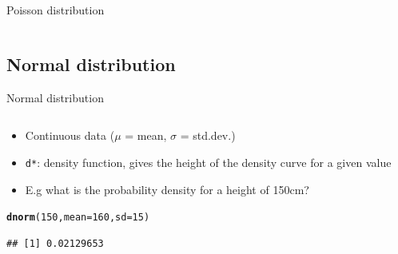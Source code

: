 \documentclass[aspectratio=169]{beamer}\usepackage[]{graphicx}\usepackage[]{color}
\makeatletter
\newcommand{\hlnum}[1]{\textcolor[rgb]{0.686,0.059,0.569}{#1}}%
\newcommand{\hlstd}[1]{\textcolor[rgb]{0.345,0.345,0.345}{#1}}%
\newcommand{\hlkwc}[1]{\textcolor[rgb]{0.333,0.667,0.333}{#1}}%
\newcommand{\hlkwd}[1]{\textcolor[rgb]{0.737,0.353,0.396}{\textbf{#1}}}%
\newenvironment{kframe}{%
 \def\at@end@of@kframe{}%
 \ifinner\ifhmode%
  \def\at@end@of@kframe{\end{minipage}}%
  \begin{minipage}{\columnwidth}%
 \fi\fi%
 \def\FrameCommand##1{\hskip\@totalleftmargin \hskip-\fboxsep
 \colorbox{shadecolor}{##1}\hskip-\fboxsep
     \hskip-\linewidth \hskip-\@totalleftmargin \hskip\columnwidth}%
 \MakeFramed {\advance\hsize-\width
   \@totalleftmargin\z@ \linewidth\hsize
   \@setminipage}}%
 {\par\unskip\endMakeFramed%
 \at@end@of@kframe}
\newenvironment{knitrout}{}{} %
\makeatother
\begin{document}
\begin{frame}[fragile]{Poisson distribution}
\begin{columns}
\begin{column}{0.5\textwidth}
\begin{knitrout}
\end{knitrout}
  \end{column}
\end{columns}
\end{frame}

\subsection{Normal distribution}
\begin{frame}[fragile]{Normal distribution}
\begin{columns}
  \begin{column}{0.5\textwidth}
  \begin{itemize}
    \item Continuous data ($\mu$ = mean, $\sigma$ = std.dev.)
    \item \texttt{d*}: density function, gives the height of the density curve for a given value
    \item E.g what is the probability density for a height of 150cm?
  \end{itemize}
\begin{knitrout}\scriptsize
{}\color{fgcolor}\begin{kframe}
\begin{alltt}
\hlkwd{dnorm}\hlstd{(}\hlnum{150}\hlstd{,}\hlkwc{mean} \hlstd{=} \hlnum{160}\hlstd{,} \hlkwc{sd}\hlstd{=}\hlnum{15}\hlstd{)}
\end{alltt}
\begin{verbatim}
## [1] 0.02129653
\end{verbatim}
\end{kframe}
\end{knitrout}
  \end{column}
  \begin{column}{0.5\textwidth}
\begin{knitrout}\scriptsize
{}\color{fgcolor}

\end{knitrout}
\end{column}
\end{columns}
\end{frame}
\end{document}
